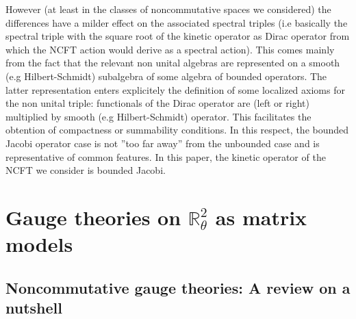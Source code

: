 \documentclass[a4paper,11pt,twoside]{article}
\numberwithin{equation}{section}
\theoremstyle{nonumberplain}
\begin{document}
However (at least in the classes of noncommutative spaces we considered) the differences have a milder effect on the associated spectral triples (i.e basically the spectral triple with the square root of the kinetic operator as Dirac operator from which the NCFT action would derive as a spectral action). This comes mainly from the fact that the relevant non unital algebras are represented on a smooth (e.g Hilbert-Schmidt) subalgebra of some algebra of bounded operators. The latter representation enters explicitely the definition of some localized axioms for the non unital triple: functionals of the Dirac operator are (left or right) multiplied by smooth (e.g Hilbert-Schmidt) operator. This facilitates the obtention of compactness or summability conditions. In this respect, the bounded Jacobi operator case is not ''too far away'' from the unbounded case and is representative of common features. In this paper, the kinetic operator of the NCFT we consider is bounded Jacobi.\par


\section{\texorpdfstring{Gauge theories on $\mathbb{R}^2_\theta$ as matrix models}{Moyal 2-d}}\label{subsection22}


\subsection{Noncommutative gauge theories: A review on a nutshell}\label{section-review}
\end{document}
